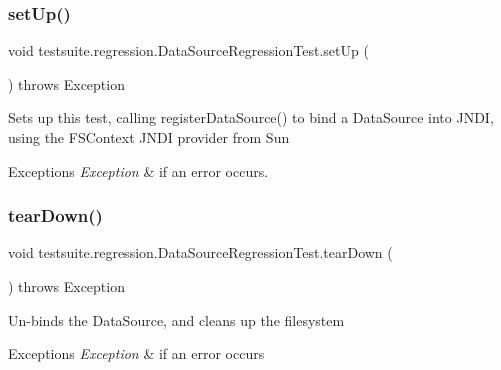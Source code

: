 \subsubsection{\texorpdfstring{set\+Up()}{setUp()}}
{\footnotesize\ttfamily void testsuite.\+regression.\+Data\+Source\+Regression\+Test.\+set\+Up (\begin{DoxyParamCaption}{ }\end{DoxyParamCaption}) throws Exception}

Sets up this test, calling register\+Data\+Source() to bind a Data\+Source into J\+N\+DI, using the F\+S\+Context J\+N\+DI provider from Sun


\begin{DoxyExceptions}{Exceptions}
{\em Exception} & if an error occurs. \\
\hline
\end{DoxyExceptions}
\mbox{\label{classtestsuite_1_1regression_1_1_data_source_regression_test_a8832a43271bfaaf86c320113cf001ecd}} 
\subsubsection{\texorpdfstring{tear\+Down()}{tearDown()}}
{\footnotesize\ttfamily void testsuite.\+regression.\+Data\+Source\+Regression\+Test.\+tear\+Down (\begin{DoxyParamCaption}{ }\end{DoxyParamCaption}) throws Exception}

Un-\/binds the Data\+Source, and cleans up the filesystem


\begin{DoxyExceptions}{Exceptions}
{\em Exception} & if an error occurs \\
\hline
\end{DoxyExceptions}
\mbox{\label{classtestsuite_1_1regression_1_1_data_source_regression_test_af69d51f59966174507009b456bcc4ef3}} 
